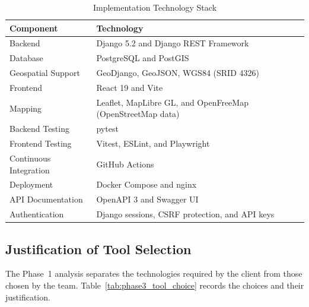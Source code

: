 \documentclass[11pt,a4paper]{article}
\begin{document}
\begin{table}[htbp]
\centering
\caption{Implementation Technology Stack}
\label{tab:phase3_technologies}
\small
\begin{tabularx}{\textwidth}{P{3.2cm} L}
\toprule
\textbf{Component} & \textbf{Technology} \\
\midrule
Backend &
Django 5.2 and Django REST Framework \\

Database &
PostgreSQL and PostGIS \\

Geospatial Support &
GeoDjango, GeoJSON, WGS84 (SRID 4326) \\

Frontend &
React 19 and Vite \\

Mapping &
Leaflet, MapLibre GL, and OpenFreeMap (OpenStreetMap data) \\

Backend Testing &
pytest \\

Frontend Testing &
Vitest, ESLint, and Playwright \\

Continuous Integration &
GitHub Actions \\

Deployment &
Docker Compose and nginx \\

API Documentation &
OpenAPI 3 and Swagger UI \\

Authentication &
Django sessions, CSRF protection, and API keys \\
\bottomrule
\end{tabularx}
\end{table}

\subsection{Justification of Tool Selection}

The Phase~1 analysis separates the technologies required by the client
from those chosen by the team. Table~\ref{tab:phase3_tool_choice}
records the choices and their justification.
\end{document}
